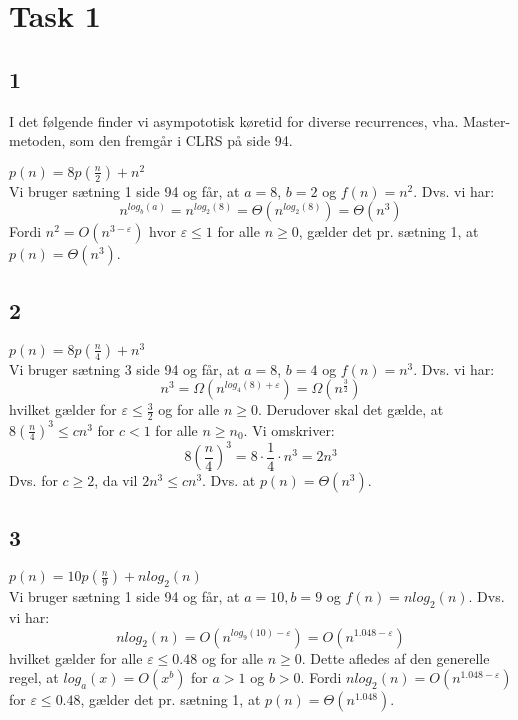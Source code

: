 \section{Task 1}

\subsection{1}

I det følgende finder vi asympototisk køretid for diverse recurrences,
vha. Master-metoden, som den fremgår i CLRS på side 94. 

$p(n) = 8p(\frac{n}{2}) + n^2$\\
Vi bruger sætning 1 side 94 og får, at $a = 8$, $b = 2$ og $f(n) = n^2$.
Dvs. vi har:
$$n^{log_b(a)} = n^{log_2(8)} = \Theta(n^{log_2(8)}) = \Theta(n^3)$$
Fordi $n^2 = O(n^{3-\varepsilon})$ hvor $\varepsilon \leq 1$ for alle $n \geq 0$, gælder det pr. sætning 1, at $p(n) = \Theta(n^3)$.

\subsection{2}

$p(n) = 8p(\frac{n}{4}) + n^3$\\
Vi bruger sætning 3 side 94 og får, at $a = 8$, $b = 4$ og $f(n) = n^3$.
Dvs. vi har:
$$n^3 = \Omega(n^{log_4(8)+\varepsilon}) = \Omega(n^{\frac{3}{2}})$$
hvilket gælder for $\varepsilon \leq \frac{3}{2}$ og for alle $n \geq 0$.
Derudover skal det gælde, at $8(\frac{n}{4})^3 \leq cn^3$ for $c < 1$ for alle $n \geq n_0$. Vi omskriver:
$$8(\frac{n}{4})^3 = 8 \cdot \frac{1}{4} \cdot n^3 = 2n^3$$
Dvs. for $c \geq 2$, da vil $2n^3 \leq cn^3$.
Dvs. at $p(n) = \Theta(n^3)$.

\subsection{3}

$p(n) = 10p(\frac{n}{9}) + nlog_2(n)$\\
Vi bruger sætning 1 side 94 og får, at $a = 10, b = 9$ og $f(n) = nlog_2(n)$.
Dvs. vi har:
$$nlog_2(n) = O(n^{log_9(10)-\varepsilon}) = O(n^{1.048 - \varepsilon})$$
hvilket gælder for alle $\varepsilon \leq 0.48$ og for alle $n \geq 0$.
Dette afledes af den generelle regel, at $log_a(x) = O(x^b)$ for $a > 1$ og $b > 0$.
Fordi $nlog_2(n) = O(n^{1.048 - \varepsilon})$ for $\varepsilon \leq 0.48$, gælder det pr. sætning 1, at $p(n) = \Theta(n^{1.048})$.

